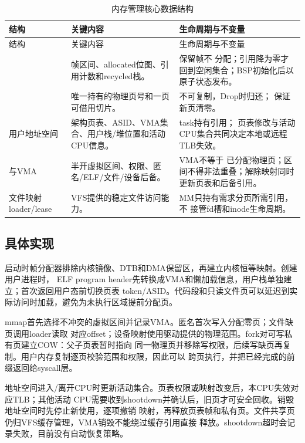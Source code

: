 \begin{longtable}{L{3.4cm}L{5.0cm}L{4.5cm}}
  \caption{内存管理核心数据结构}\label{tab:mm-structures}\\
  \toprule
  结构 & 关键内容 & 生命周期与不变量 \\
  \midrule
  \endfirsthead
  \toprule
  结构 & 关键内容 & 生命周期与不变量 \\
  \midrule
  \endhead
   & 帧区间、allocated位图、引用计数和recycled栈。 & 保留帧不
  分配；引用降为零才回到空闲集合；BSP初始化后以原子状态发布。\\
   & 唯一持有的物理页号和一页可借用切片。 & 不可复制，Drop时归还；
  保证新页清零。\\
  用户地址空间 & 架构页表、ASID、VMA集合、用户栈/堆位置和活动CPU信息。 & task持有引用；
  页表修改与活动CPU集合共同决定本地或远程TLB失效。\\
  与VMA & 半开虚拟区间、权限、匿名/ELF/文件/设备后备。 & VMA不等于
  已分配物理页；区间不得非法重叠；解除映射同时更新页表和后备引用。\\
  文件映射loader/lease & VFS提供的稳定文件访问能力。 & MM只持有需求分页所需引用，不
  接管fd槽和inode生命周期。\\
  \bottomrule
\end{longtable}

\subsection{具体实现}

启动时帧分配器排除内核镜像、DTB和DMA保留区，再建立内核恒等映射。创建用户进程时，
ELF program header先转换成VMA和懒加载信息，用户栈单独建立；首次返回用户态前切换页表
token/ASID。代码段和只读文件页可以延迟到实际访问时加载，避免为未执行区域提前分配页。

mmap首先选择不冲突的虚拟区间并记录VMA。匿名首次写入分配零页；文件缺页调用loader读取
对应offset；设备映射使用驱动提供的物理范围。fork对可写私有页建立COW：父子页表暂时指向
同一物理页并移除写权限，后续写缺页再复制。用户内存复制逐页校验范围和权限，因此可以
跨页执行，并把已经完成的前缀返回给syscall层。

地址空间进入/离开CPU时更新活动集合。页表权限或映射改变后，本CPU失效对应TLB；其他活动
CPU需要收到shootdown并确认后，旧页才可安全回收。销毁地址空间时先停止新使用，逐项撤销
映射，再释放页表帧和私有页。文件共享页仍归VFS缓存管理，VMA销毁不能绕过缓存引用直接
释放。shootdown超时会记录失败，目前没有自动恢复策略。

